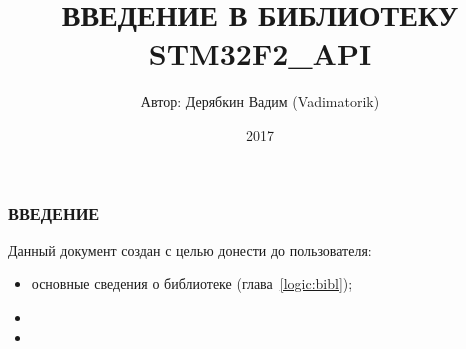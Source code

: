 \documentclass[a4paper, 12pt]{report}		%
\begin{document}
	\title {ВВЕДЕНИЕ В БИБЛИОТЕКУ STM32F2\_API}			%
	\author {Автор: Дерябкин Вадим (Vadimatorik)}
	\date {2017}
	\maketitle

\subsubsection{ВВЕДЕНИЕ}
Данный документ создан с целью донести до пользователя:
\begin{itemize}
	\item основные сведения о библиотеке (глава~\ref{logic:bibl});
	\item 
	\item
\end{itemize}


	\tableofcontents
	\clearpage							%
	
	
%	
\end{document}
